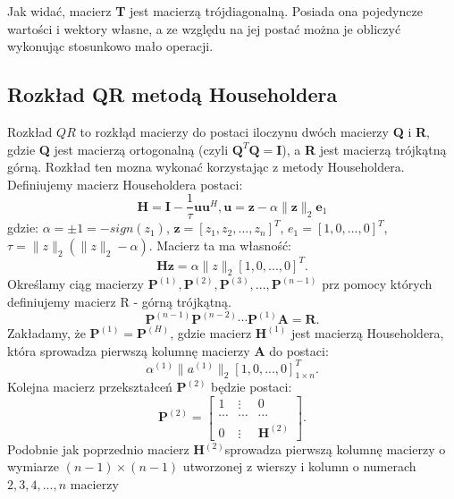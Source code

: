 \documentclass{article}
\begin{document}
Jak widać, macierz \textbf{T} jest macierzą trójdiagonalną. Posiada ona pojedyncze wartości i wektory własne, a ze względu na jej postać można je obliczyć wykonując stosunkowo mało operacji. 

\subsection{Rozkład QR metodą Householdera \cite{2} }
Rozkład $QR$ to rozkłąd macierzy do postaci iloczynu dwóch macierzy \textbf{Q} i \textbf{R}, gdzie \textbf{Q} jest macierzą ortogonalną (czyli $\textbf{Q}^T\textbf{Q} = \textbf{I}$), a \textbf{R} jest macierzą trójkątną górną. Rozkład ten mozna wykonać korzystając z metody Householdera.
Definiujemy macierz Householdera postaci: 
\begin{equation}
\textbf{H} = \textbf{I} - \frac{1}{\tau} \textbf{uu}^H, \textbf{u} = \textbf{z} - \alpha \| \textbf{z} \| _2 \textbf{e}_1
\end{equation}
gdzie: $\alpha = \pm 1 = -sign(z_1)$, $\textbf{z} = [z_1, z_2, ..., z_n]^T$,  $e_1 = [1, 0, ... , 0]^T$, $\tau = \|z\|_2(\|z\|_2 - \alpha)$. Macierz ta ma własność:
\begin{equation}
\textbf{Hz} = \alpha \|z\|_2 [1, 0, ... , 0]^T .
\end{equation}
Określamy ciąg macierzy $\textbf{P}^{(1)}, \textbf{P}^{(2)}, \textbf{P}^{(3)}, ..., \textbf{P}^{(n-1)}$ prz pomocy których definiujemy macierz R - górną trójkątną. 
\begin{equation}
\textbf{P}^{(n-1)} \textbf{P}^{(n-2)} \cdots \textbf{P}^{(1)} \textbf{A} = \textbf{R}.
\end{equation}
Zakładamy, że $\textbf{P}^{(1)} = \textbf{P}^{(H)}$, gdzie macierz $\textbf{H}^{(1)}$ jest macierzą Householdera, która sprowadza pierwszą kolumnę macierzy \textbf{A} do postaci:
\begin{equation}
\alpha^{(1)} \| a^{(1)} \| _2 [1, 0, ... , 0]^T _{1 \times n}.
\end{equation}
Kolejna macierz przekształceń $\textbf{P}^{(2)}$ będzie postaci:
\begin{equation}
\textbf{P}^{(2)} = 
\begin{bmatrix}
	1 & \vdots & 0 \\
	\cdots & \cdots & \cdots \\
	0 & \vdots & \textbf{H}^{(2)}
\end{bmatrix}.
\end{equation}
Podobnie jak poprzednio macierz \textbf{H$^{(2)}$}sprowadza pierwszą kolumnę macierzy o wymiarze $(n-1) \times (n-1)$ utworzonej z wierszy i kolumn o numerach $2,3,4,...,n$ macierzy 
\end{document}

